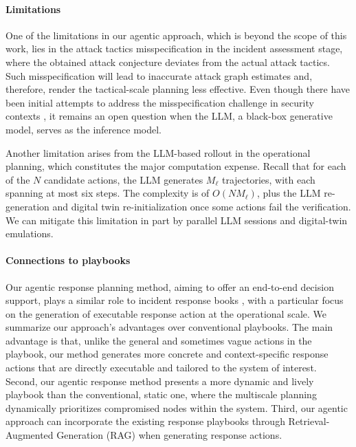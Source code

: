 \documentclass[sigconf]{acmart}
\begin{document}
\paragraph{Limitations} One of the limitations in our agentic approach, which is beyond the scope of this work, lies in the attack tactics misspecification in the incident assessment stage, where the obtained attack conjecture deviates from the actual attack tactics. Such misspecification will lead to inaccurate attack graph estimates and, therefore, render the tactical-scale planning less effective. Even though there have been initial attempts to address the misspecification challenge in security contexts \cite{kim-tao25col,kim-tao25quantization}, it remains an open question when the LLM, a black-box generative model, serves as the inference model.

Another limitation arises from the LLM-based rollout in the operational planning, which constitutes the major computation expense. Recall that for each of the $N$ candidate actions, the LLM generates $M_\ell$ trajectories, with each spanning at most six steps. The complexity is of $O(N M_\ell)$, plus the LLM re-generation and digital twin re-initialization once some actions fail the verification. We can mitigate this limitation in part by parallel LLM sessions and digital-twin emulations.   

\paragraph{Connections to playbooks} Our agentic response planning method, aiming to offer an end-to-end decision support, plays a similar role to incident response books \cite{applebaum}, with a particular focus on the generation of executable response action at the operational scale. We summarize our approach's advantages over conventional playbooks. The main advantage is that, unlike the general and sometimes vague actions in the playbook, our method generates more concrete and context-specific response actions that are directly executable and tailored to the system of interest. Second, our agentic response method presents a more dynamic and lively playbook than the conventional, static one, where the multiscale planning dynamically prioritizes compromised nodes within the system. Third, our agentic approach can incorporate the existing response playbooks through Retrieval-Augmented Generation (RAG) when generating response actions.  
\end{document}
